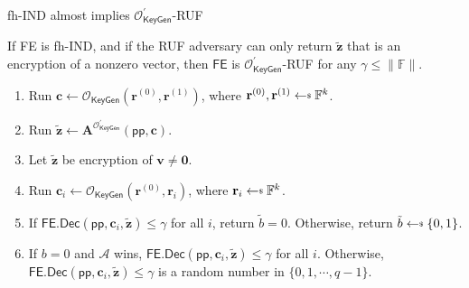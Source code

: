 \begin{frame}{fh-IND almost implies $\mathcal{O}^\prime_{\textsf{KeyGen}}$-RUF}

\begin{theorem}
	If \textsf{FE} is fh-IND, and if the RUF adversary can only return $\mathbf{\tilde{z}}$ that is an encryption of a nonzero vector, then $\textsf{FE}$ is $\mathcal{O}^\prime_{\textsf{KeyGen}}$-RUF for any $\gamma \leq \|\mathbb{F}\|$.
\end{theorem}

\begin{enumerate}

	\item<3-> Run $ \mathbf{c} \gets \mathcal{O}_{\textsf{KeyGen}}(\mathbf{r}^{(0)}, \mathbf{r}^{(1)})$, where $\mathbf{r}^{(0)}, \mathbf{r}^{(1)} \getsdollar \mathbb{F}^k$.

	\item<4-> Run $\mathbf{\tilde{z}} \gets \mathbf{A}^{\mathcal{O}_{\textsf{KeyGen}}^\prime}(\textsf{pp}, \mathbf{c})$.

	\item<5-> Let $\mathbf{\tilde{z}}$ be encryption of $\mathbf{v} \neq \mathbf{0}$.

	\item<6-> Run $ \mathbf{c}_i \gets \mathcal{O}_{\textsf{KeyGen}}(\mathbf{r}^{(0)}, \mathbf{r}_i)$, where $\mathbf{r}_i \getsdollar \mathbb{F}^k$.

	\item<7-> If $\textsf{FE.Dec}(\textsf{pp}, \mathbf{c}_i, \mathbf{\tilde{z}}) \leq \gamma$ for all $i$, return $\tilde{b} = 0$. Otherwise, return $\tilde{b} \getsdollar \{0, 1\}$.

	\item<8-> If $b = 0$ and $\mathcal{A}$ wins, $\textsf{FE.Dec}(\textsf{pp}, \mathbf{c}_i, \mathbf{\tilde{z}}) \leq \gamma$ for all $i$. Otherwise, $\textsf{FE.Dec}(\textsf{pp}, \mathbf{c}_i, \mathbf{\tilde{z}}) \leq \gamma$ is a random number in $\{0, 1, \cdots, q-1\}$.

\end{enumerate}


\end{frame}


